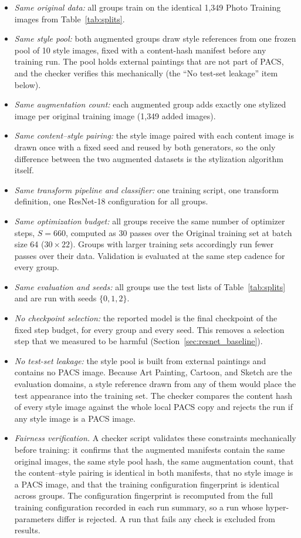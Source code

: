 \begin{itemize}
\item \textit{Same original data:} all groups train on the identical 1{,}349 Photo Training images from Table~\ref{tab:splits}.
\item \textit{Same style pool:} both augmented groups draw style references from one frozen pool of 10 style images, fixed with a content-hash manifest before any training run. The pool holds external paintings that are not part of PACS, and the checker verifies this mechanically (the ``No test-set leakage'' item below).
\item \textit{Same augmentation count:} each augmented group adds exactly one stylized image per original training image (1{,}349 added images).
\item \textit{Same content--style pairing:} the style image paired with each content image is drawn once with a fixed seed and reused by both generators, so the only difference between the two augmented datasets is the stylization algorithm itself.
\item \textit{Same transform pipeline and classifier:} one training script, one transform definition, one ResNet-18 configuration for all groups.
\item \textit{Same optimization budget:} all groups receive the same number of optimizer steps, $S = 660$, computed as 30 passes over the Original training set at batch size 64 ($30 \times 22$). Groups with larger training sets accordingly run fewer passes over their data. Validation is evaluated at the same step cadence for every group.
\item \textit{Same evaluation and seeds:} all groups use the test lists of Table~\ref{tab:splits} and are run with seeds $\{0, 1, 2\}$.
\item \textit{No checkpoint selection:} the reported model is the final checkpoint of the fixed step budget, for every group and every seed. This removes a selection step that we measured to be harmful (Section~\ref{sec:resnet_baseline}).
\item \textit{No test-set leakage:} the style pool is built from external paintings and contains no PACS image. Because Art Painting, Cartoon, and Sketch are the evaluation domains, a style reference drawn from any of them would place the test appearance into the training set. The checker compares the content hash of every style image against the whole local PACS copy and rejects the run if any style image is a PACS image.
\item \textit{Fairness verification.} A checker script validates these constraints mechanically before training: it confirms that the augmented manifests contain the same original images, the same style pool hash, the same augmentation count, that the content--style pairing is identical in both manifests, that no style image is a PACS image, and that the training configuration fingerprint is identical across groups. The configuration fingerprint is recomputed from the full training configuration recorded in each run summary, so a run whose hyper-parameters differ is rejected. A run that fails any check is excluded from results.
\end{itemize}

